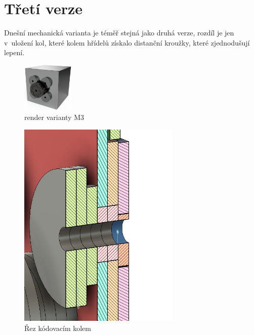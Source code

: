 \section{Třetí verze}

Dnešní mechanická varianta je téměř stejná jako druhá verze, rozdíl je jen v~uložení kol, které kolem hřídelů získalo distanční kroužky, které
zjednodušují lepení. 

\begin{figure}[htbp]
    \centering
    \includegraphics[width=70pt]{kapitoly/obrazky/M3/predni_render.png}
    \caption{render varianty M3}
    \label{fig:M3-render}
\end{figure}

\begin{figure}[htbp]
    \centering
    \includegraphics[width=220pt]{kapitoly/obrazky/M3/rez.png}
    \caption{Řez kódovacím kolem}
    \label{fig:M3-rez-kolem}
\end{figure}

\newpage